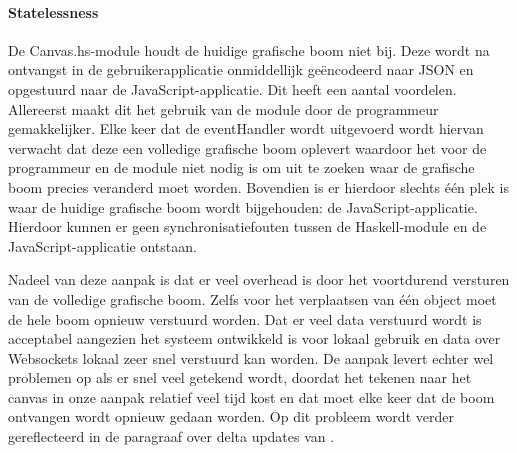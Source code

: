 \paragraph{Statelessness} \label{par:statelessness}
De Canvas.hs-module houdt de huidige grafische boom niet bij. Deze wordt na ontvangst in de gebruikerapplicatie onmiddellijk geëncodeerd naar JSON en opgestuurd naar de JavaScript-applicatie. Dit heeft een aantal voordelen. Allereerst maakt dit het gebruik van de module door de programmeur gemakkelijker. Elke keer dat de eventHandler wordt uitgevoerd wordt hiervan verwacht dat deze een volledige grafische boom oplevert waardoor het voor de programmeur en de module niet nodig is om uit te zoeken waar de grafische boom precies veranderd moet worden. Bovendien is er hierdoor slechts één plek is waar de huidige grafische boom wordt bijgehouden: de JavaScript-applicatie. Hierdoor kunnen er geen synchronisatiefouten tussen de Haskell-module en de JavaScript-applicatie ontstaan. 

Nadeel van deze aanpak is dat er veel overhead is door het voortdurend versturen van de volledige grafische boom. Zelfs voor het verplaatsen van één object moet de hele boom opnieuw verstuurd worden. Dat er veel data verstuurd wordt is acceptabel aangezien het systeem ontwikkeld is voor lokaal gebruik en data over Websockets lokaal zeer snel verstuurd kan worden. De aanpak levert echter wel problemen op als er snel veel getekend wordt, doordat het tekenen naar het canvas in onze aanpak relatief veel tijd kost en dat moet elke keer dat de boom ontvangen wordt opnieuw gedaan worden. Op dit probleem wordt verder gereflecteerd in de paragraaf over delta updates van .